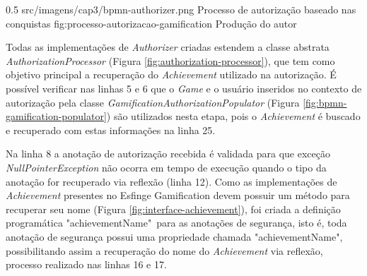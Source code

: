 \begin{image}
{0.5}
{src/imagens/cap3/bpmn-authorizer.png}
{Processo de autorização baseado nas conquistas}
{fig:processo-autorizacao-gamification}
{Produção do autor}
\end{image}


\par Todas as implementações de \textit{Authorizer} criadas estendem a classe abstrata \textit{AuthorizationProcessor} (Figura \ref{fig:authorization-processor}), que tem como objetivo principal a recuperação do \textit{Achievement} utilizado na autorização. É possível verificar nas linhas 5 e 6 que o \textit{Game} e o usuário inseridos no contexto de autorização pela classe \textit{GamificationAuthorizationPopulator} (Figura \ref{fig:bpmn-gamification-populator}) são utilizados nesta etapa, pois o \textit{Achievement} é buscado e recuperado com estas informações na linha 25.
\par Na linha 8 a anotação de autorização recebida é validada para que exceção \textit{NullPointerException} não ocorra em tempo de execução quando o tipo da anotação for recuperado via reflexão (linha 12). Como as implementações de \textit{Achievement} presentes no Esfinge Gamification devem possuir um método para recuperar seu nome (Figura \ref{fig:interface-achievement}), foi criada a definição programática "achievementName"\ para as anotações de segurança, isto é, toda anotação de segurança possui uma propriedade chamada "achievementName", possibilitando assim a recuperação do nome do \textit{Achievement} via reflexão, processo realizado nas linhas 16 e 17.

